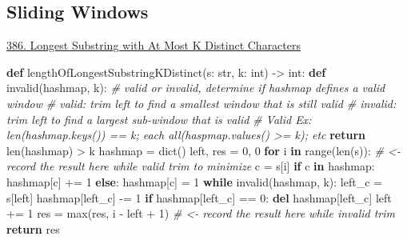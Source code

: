 \documentclass[
]{article}
\newenvironment{Shaded}{}{}
\newcommand{\BuiltInTok}[1]{#1}
\newcommand{\CommentTok}[1]{\textcolor[rgb]{0.38,0.63,0.69}{\textit{#1}}}
\newcommand{\ControlFlowTok}[1]{\textcolor[rgb]{0.00,0.44,0.13}{\textbf{#1}}}
\newcommand{\DecValTok}[1]{\textcolor[rgb]{0.25,0.63,0.44}{#1}}
\newcommand{\KeywordTok}[1]{\textcolor[rgb]{0.00,0.44,0.13}{\textbf{#1}}}
\newcommand{\NormalTok}[1]{#1}
\newcommand{\OperatorTok}[1]{\textcolor[rgb]{0.40,0.40,0.40}{#1}}
\begin{document}
\hypertarget{sliding-windows}{%
\subsection{Sliding Windows}\label{sliding-windows}}

\href{https://www.lintcode.com/problem/longest-substring-with-at-most-k-distinct-characters/description}{386.
Longest Substring with At Most K Distinct Characters}

\begin{Shaded}
\begin{Highlighting}[]
\KeywordTok{def}\NormalTok{ lengthOfLongestSubstringKDistinct(s: }\BuiltInTok{str}\NormalTok{, k: }\BuiltInTok{int}\NormalTok{) }\OperatorTok{{-}\textgreater{}} \BuiltInTok{int}\NormalTok{:}
  \KeywordTok{def}\NormalTok{ invalid(hashmap, k):}
    \CommentTok{\# valid or invalid, determine if hashmap defines a valid window}
    \CommentTok{\# valid: trim left to find a smallest window that is still valid}
    \CommentTok{\# invalid: trim left to find a largest sub{-}window that is valid }
    \CommentTok{\# Valid Ex: len(hashmap.keys()) == k; each all(haspmap.values() \textgreater{}= k); etc }
    \ControlFlowTok{return} \BuiltInTok{len}\NormalTok{(hashmap) }\OperatorTok{\textgreater{}}\NormalTok{ k}
\NormalTok{  hashmap }\OperatorTok{=} \BuiltInTok{dict}\NormalTok{()}
\NormalTok{  left, res }\OperatorTok{=} \DecValTok{0}\NormalTok{, }\DecValTok{0}
  \ControlFlowTok{for}\NormalTok{ i }\KeywordTok{in} \BuiltInTok{range}\NormalTok{(}\BuiltInTok{len}\NormalTok{(s)):  }
    \CommentTok{\# \textless{}{-} record the result here \textquotesingle{}while valid trim to minimize\textquotesingle{}}
\NormalTok{    c }\OperatorTok{=}\NormalTok{ s[i]}
    \ControlFlowTok{if}\NormalTok{ c }\KeywordTok{in}\NormalTok{ hashmap: hashmap[c] }\OperatorTok{+=} \DecValTok{1}
    \ControlFlowTok{else}\NormalTok{: hashmap[c] }\OperatorTok{=} \DecValTok{1}
    \ControlFlowTok{while}\NormalTok{ invalid(hashmap, k):}
\NormalTok{      left\_c }\OperatorTok{=}\NormalTok{ s[left]}
\NormalTok{      hashmap[left\_c] }\OperatorTok{{-}=} \DecValTok{1}
      \ControlFlowTok{if}\NormalTok{ hashmap[left\_c] }\OperatorTok{==} \DecValTok{0}\NormalTok{:}
        \KeywordTok{del}\NormalTok{ hashmap[left\_c]}
\NormalTok{      left }\OperatorTok{+=} \DecValTok{1}
\NormalTok{    res }\OperatorTok{=} \BuiltInTok{max}\NormalTok{(res, i }\OperatorTok{{-}}\NormalTok{ left }\OperatorTok{+} \DecValTok{1}\NormalTok{)  }\CommentTok{\# \textless{}{-} record the result here \textquotesingle{}while invalid trim\textquotesingle{}}
  \ControlFlowTok{return}\NormalTok{ res}
\end{Highlighting}
\end{Shaded}
\end{document}
